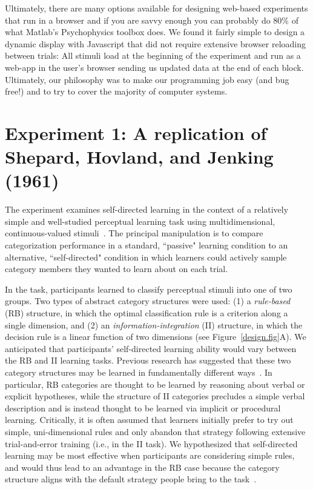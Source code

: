 \documentclass[3p,twocolumn,authoryear,10pt]{elsarticle}
\begin{document}
Ultimately, there are many options available for designing web-based experiments that run in a browser and if you are savvy enough you can probably do 80\% of what Matlab's Psychophysics toolbox does. We found it fairly simple to design a dynamic display with Javascript that did not require extensive browser reloading between trials: All stimuli load at the beginning of the experiment and run as a web-app in the user's browser sending us updated data at the end of each block. Ultimately, our philosophy was to make our programming job easy (and bug free!) and to try to cover the majority of computer systems.





\section{Experiment 1: A replication of Shepard, Hovland, and Jenking (1961)}

The experiment examines self-directed learning in the context of a relatively simple and well-studied perceptual learning task using multidimensional, continuous-valued stimuli~\citep{Ashby:1998p8468,Ashby:2002p13331}.  The principal manipulation is to compare categorization performance in a standard, ``passive" learning condition to an alternative, ``self-directed" condition in which learners could actively sample category members they wanted to learn about on each trial.   

In the task, participants learned to classify perceptual stimuli into one of two groups.  Two types of abstract category structures were used: (1) a \textit{rule-based} (RB) structure, in which the optimal classification rule is a criterion along a single dimension, and (2) an \textit{information-integration} (II) structure, in which the decision rule is a linear function of two dimensions (see Figure~\ref{design.fig}A). We anticipated that participants' self-directed learning ability would vary between the RB and II learning tasks. Previous research has suggested that these two category structures may be learned in fundamentally different ways~\citep{Ashby:1998p8468}. In particular, RB categories are thought to be learned by reasoning about verbal or explicit hypotheses, while the structure of II categories precludes a simple verbal description and is instead thought to be learned via implicit or procedural learning. Critically, it is often assumed that learners initially prefer to try out simple, uni-dimensional rules and only abandon that strategy following extensive trial-and-error training (i.e., in the II task). We hypothesized that self-directed learning may be most effective when participants are considering simple rules, and would thus lead to an advantage in the RB case because the category structure aligns with the default strategy people bring to the task~\citep{Ashby:1999ig,Kruschke:1993ty}. 
\end{document}
